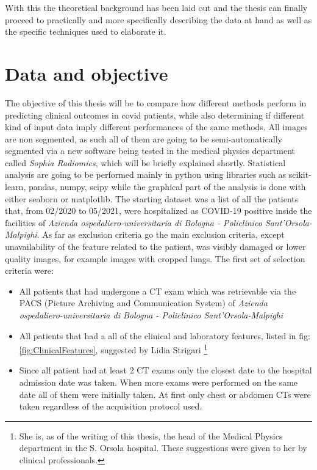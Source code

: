 With this the theoretical background has been laid out and the thesis can finally proceed to practically and more specifically describing the data at hand as well as the specific techniques used to elaborate it.


\section{Data and objective}
\label{chap:freefree}
The objective of this thesis will be to compare how different methods perform in predicting clinical outcomes in covid patients, while also determining if different kind of input data imply different performances of the same methods.
All images are non segmented, as such all of them are going to be semi-automatically segmented via a new software being tested in the medical physics department called \textit{Sophia Radiomics}, which will be briefly explained shortly. Statistical analysis are going to be performed mainly in python using libraries such as scikit-learn, pandas, numpy, scipy while the graphical part of the analysis is done with either seaborn or matplotlib.
The starting dataset was a list of all the patients that, from 02/2020 to 05/2021, were hospitalized as COVID-19 positive inside the facilities of \textit{Azienda ospedaliero-universitaria di Bologna - Policlinico Sant'Orsola-Malpighi}. As far as exclusion criteria go the main exclusion criteria, except unavailability of the feature related to the patient, was visibly damaged or lower quality images, for example images with cropped lungs. The first set of selection criteria were:

\begin{itemize}
\item All patients that had undergone a CT exam which was retrievable via the PACS (Picture Archiving and Communication System) of \textit{Azienda ospedaliero-universitaria di Bologna - Policlinico Sant'Orsola-Malpighi}
\item All patients that had a all of the clinical and laboratory features, listed in fig:\ref{fig:ClinicalFeatures}, suggested by Lidia Strigari \footnote{She is, as of the writing of this thesis, the head of the Medical Physics department in the S. Orsola hospital. These suggestions were given to her by clinical professionals.}
\item Since all patient had at least 2 CT exams only the closest date to the hospital admission date was taken. When more exams were performed on the same date all of them were initially taken. At first only chest or abdomen CTs were taken regardless of the acquisition protocol used.
\end{itemize}

